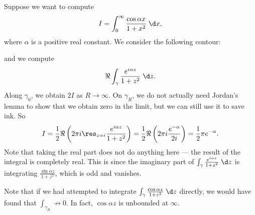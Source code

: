 \documentclass[a4paper]{article}
\begin{document}
\begin{eg}
  Suppose we want to compute
  \[
    I = \int_0^\infty \frac{\cos \alpha x}{1 + x^2}\;\d x,
  \]
  where $\alpha$ is a positive real constant. We consider the following contour:
  \begin{center}
  \end{center}
  and we compute
  \[
    \Re \int_\gamma \frac{e^{i\alpha z}}{1 + z^2}\;\d z.
  \]
  Along $\gamma_0$, we obtain $2I$ as $R \to \infty$. On $\gamma_R$, we do not actually need Jordan's lemma to show that we obtain zero in the limit, but we can still use it to save ink. So
  \[
    I = \frac{1}{2} \Re \left(2\pi i\res_{z = i} \frac{e^{i\alpha z}}{1 + z^2}\right) = \frac{1}{2} \Re\left(2\pi i\frac{e^{-\alpha}}{2i}\right) = \frac{1}{2}\pi e^{-\alpha}.
  \]
  Note that taking the real part does not do anything here --- the result of the integral is completely real. This is since the imaginary part of $\int_\gamma \frac{e^{i\alpha z}}{1 + z^2} \;\d z$ is integrating $\frac{\sin \alpha z}{1 + z^2}$, which is odd and vanishes.

  Note that if we had attempted to integrate $\int_\gamma \frac{\cos \alpha z}{1 + z^2}\;\d z$ directly, we would have found that $\int_{\gamma_R} \not\to 0$. In fact, $\cos \alpha z$ is unbounded at $\infty$.
\end{eg}
\end{document}
